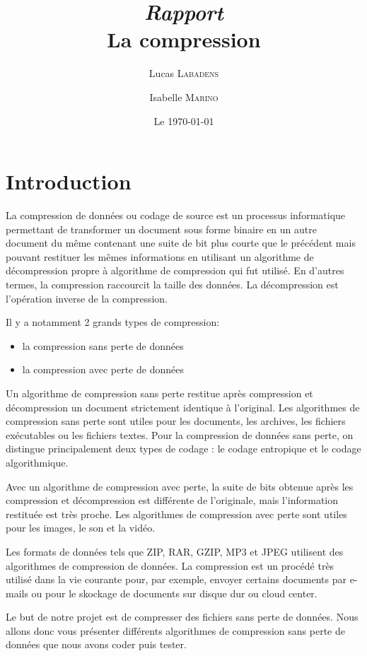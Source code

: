 \documentclass{report}
\title{\textit{Rapport} \\ La compression}
\author{Lucas \textsc{Labadens} \and Isabelle \textsc{Marino} }
\date{Le \today}
\begin{document}
\maketitle
 

\section*{Introduction}
La compression de données ou codage de source est un processus informatique permettant de transformer un document sous forme binaire en un autre document du même contenant une suite de bit plus courte que le précédent mais pouvant restituer les mêmes informations en utilisant un algorithme de décompression propre à algorithme de compression qui fut utilisé. En d'autres termes, la compression raccourcit la taille des données. La décompression est l'opération inverse de la compression.

Il y a notamment 2 grands types de compression:
\begin{itemize}
\item la compression sans perte de données
\item la compression avec perte de données
\end{itemize}

Un algorithme de compression sans perte restitue après compression et décompression un document strictement identique à l'original. Les algorithmes de compression sans perte sont utiles pour les documents, les archives, les fichiers exécutables ou les fichiers textes.
Pour la compression de données sans perte, on distingue principalement deux types de codage : le codage entropique et le codage algorithmique.

Avec un algorithme de compression avec perte, la suite de bits obtenue après les  compression et décompression est différente de l'originale, mais l'information restituée est très proche. Les algorithmes de compression avec perte sont utiles pour les images, le son et la vidéo.

Les formats de données tels que ZIP, RAR, GZIP, MP3 et JPEG utilisent des algorithmes de compression de données.
La compression est un procédé très utilisé dans la vie courante pour, par exemple, envoyer certains documents par e-mails ou pour le skockage de documents sur disque dur ou cloud center.
  
Le but de notre projet est de compresser des fichiers sans perte de données. 
Nous allons donc vous présenter différents algorithmes de compression sans perte de données que nous avons coder puis tester.
\end{document}

